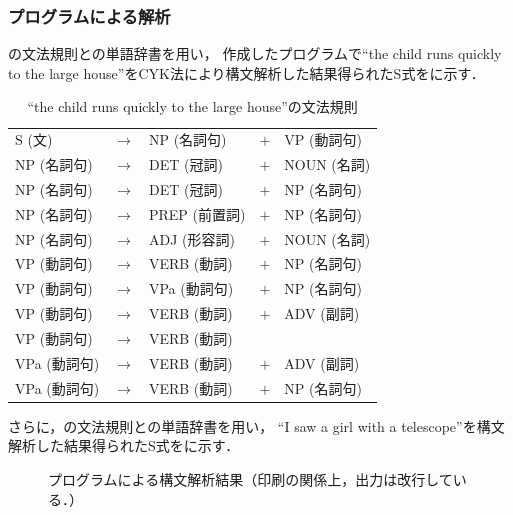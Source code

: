 \documentclass[uplatex, dvipdfmx, a4paper, twocolumn]{jsarticle}
\begin{document}
      \subsubsection{プログラムによる解析}
      の文法規則との単語辞書を用い，
      作成したプログラムで``the child runs quickly to the large house''をCYK法により構文解析した結果得られたS式をに示す．
      \begin{table}[htb]
        \centering
        \caption{``the child runs quickly to the large house''の文法規則}
        \label{tab:syntax_child}
        \begin{tabular}{l c l c l} \hline
          S (文) & $\to$ & NP (名詞句) & $+$ & VP (動詞句) \\
          NP (名詞句) & $\to$ & DET (冠詞) & $+$ & NOUN (名詞) \\
          NP (名詞句) & $\to$ & DET (冠詞) & $+$ & NP (名詞句) \\
          NP (名詞句) & $\to$ & PREP (前置詞) & $+$ & NP (名詞句) \\
          NP (名詞句) & $\to$ & ADJ (形容詞) & $+$ & NOUN (名詞) \\
          VP (動詞句) & $\to$ & VERB (動詞) & $+$ & NP (名詞句) \\
          VP (動詞句) & $\to$ & VPa (動詞句) & $+$ & NP (名詞句) \\
          VP (動詞句) & $\to$ & VERB (動詞) & $+$ & ADV (副詞) \\
          VP (動詞句) & $\to$ & VERB (動詞) & & \\
          VPa (動詞句) & $\to$ & VERB (動詞) & $+$ & ADV (副詞) \\
          VPa (動詞句) & $\to$ & VERB (動詞) & $+$ & NP (名詞句) \\ \hline
        \end{tabular}
      \end{table}

      さらに，の文法規則との単語辞書を用い，
      ``I saw a girl with a telescope''を構文解析した結果得られたS式をに示す．
      \begin{figure}[htpb]
        \centering
        \caption{プログラムによる構文解析結果（印刷の関係上，出力は改行している．）}
        \label{fig:result_cyk}
      \end{figure}
\end{document}
